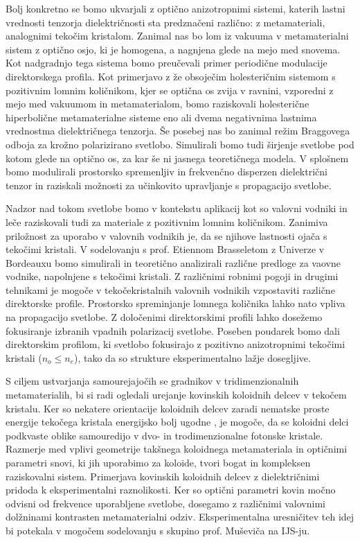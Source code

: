 \documentclass[a4paper,11pt]{article}
\begin{document}

Bolj konkretno se bomo ukvarjali z optično anizotropnimi sistemi, katerih lastni vrednosti tenzorja dielektričnosti sta predznačeni različno: z metamateriali, analognimi tekočim kristalom. 
Zanimal nas bo lom iz vakuuma v metamaterialni sistem z optično osjo, ki je homogena, a nagnjena glede na mejo med snovema. 
Kot nadgradnjo tega sistema bomo preučevali primer periodične modulacije direktorskega profila. 
Kot primerjavo z že obsoječim holesteričnim sistemom s pozitivnim lomnim količnikom, kjer se optična os zvija v ravnini, vzporedni z mejo med vakuumom in metamaterialom, bomo raziskovali holesterične hiperbolične metamaterialne sisteme eno ali dvema negativnima lastnima vrednostma dielektričnega tenzorja.
Še posebej nas bo zanimal režim Braggovega odboja za krožno polarizirano svetlobo. 
Simulirali bomo tudi širjenje svetlobe pod kotom glede na optično os, za kar še ni jasnega teoretičnega modela. 
V splošnem bomo modulirali prostorsko spremenljiv in frekvenčno disperzen dielektrični tenzor in raziskali možnosti za učinkovito upravljanje s propagacijo svetlobe. 



Nadzor nad tokom svetlobe bomo v kontekstu aplikacij kot so valovni vodniki in leče raziskovali tudi za materiale z pozitivnim lomnim količnikom. 
Zanimiva priložnost za uporabo v valovnih vodnikih je, da se njihove lastnosti ojača s tekočimi kristali. 
V sodelovanju s prof. Etiennom Brasseletom z Univerze v Bordeauxu bomo simulirali in teoretično analizirali različne predloge za vaovne vodnike, napolnjene s tekočimi kristali. 
Z različnimi robnimi pogoji in drugimi tehnikami je mogoče v tekočekristalnih valovnih vodnikih vzpostaviti različne direktorske profile. 
Prostorsko spreminjanje lomnega količnika lahko nato vpliva na propagacijo svetlobe. 
Z določenimi direktorskimi profili lahko dosežemo fokusiranje izbranih vpadnih polarizacij svetlobe. 
Poseben poudarek bomo dali direktorskim profilom, ki svetlobo fokusirajo z pozitivno anizotropnimi tekočimi kristali ($n_o \leq n_e$), tako da so strukture eksperimentalno lažje dosegljive. 



S ciljem ustvarjanja samourejajočih se gradnikov v tridimenzionalnih metamaterialih, bi si radi ogledali urejanje kovinskih koloidnih delcev v tekočem kristalu. 
Ker so nekatere orientacije koloidnih delcev zaradi nematske proste energije tekočega kristala energijsko bolj ugodne \cite{musevic-2013-assembly,smalyukh-2009-assembly}, je mogoče, da se koloidni delci podkvaste oblike samouredijo v dvo- in trodimenzionalne fotonske kristale. 
Razmerje med vplivi geometrije takšnega koloidnega metamateriala in optičnimi parametri snovi, ki jih uporabimo za koloide, tvori bogat in kompleksen raziskovalni sistem.
Primerjava kovinskih koloidnih delcev z dielektričnimi pridoda k eksperimentalni raznolikosti. 
Ker so optični parametri kovin močno odvisni od frekvence uporabljene svetlobe, dosegamo z različnimi valovnimi dolžninami kontrasten metamaterialni odziv. 
Eksperimentalna uresničitev teh idej bi potekala v mogočem sodelovanju s skupino prof. Muševiča na IJS-ju. 
\end{document}
